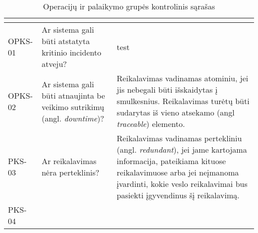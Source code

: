 \documentclass{VUMIFPSkursinis}
\begin{document}
\begin{center}
	\small
	\begin{longtable}{|C{2cm}|L{5cm}|L{8cm}|}
		\caption{Operacijų ir palaikymo grupės kontrolinis sąrašas}
		\label{table:EmployeeSalary}
		\\ \hline
		                                 &
		                     &
		\\ \hline
		OPKS-01                                                                         &
		Ar sistema gali būti atstatyta kritinio incidento atveju?                       &
		test                                                                                                                                                                                                                                                                                                                                                                                                                                          \\ \hline
		OPKS-02                                                                         &
		Ar sistema gali būti atnaujinta be veikimo sutrikimų (angl. \textit{downtime})? &
		Reikalavimas vadinamas atominiu, jei jis nebegali būti išskaidytas į smulkesnius. Reikalavimas turėtų būti sudarytas iš vieno atsekamo (angl \textit{traceable}) elemento.                                                                                                                                                                                                                                                                    \\ \hline
		PKS-03                                                                          &
		Ar reikalavimas nėra perteklinis?                                               &
		Reikalavimas vadinamas pertekliniu (angl. \textit{redundant}), jei jame kartojama informacija, pateikiama kituose reikalavimuose arba jei neįmanoma įvardinti, kokie veslo reikalavimai bus pasiekti įgyvendinus šį reikalavimą.                                                                                                                                                                                                              \\ \hline
		PKS-04                                                                          &

\end{longtable}
\end{center}
\end{document}
